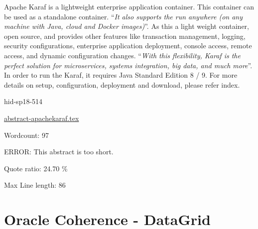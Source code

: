 Apache Karaf is a lightweight enterprise application container. This
container can be used as a standalone container.  \color{blue}``\emph{It also supports
the run anywhere (on any machine with Java, cloud and Docker
images)}''\color{black}\cite{hid-sp18-514-apachekaraf}.  As this a light weight
container, open source, and provides other features like transaction
management\cite{karaf_transaction}, logging, security configurations,
enterprise application deployment, console access, remote access, and
dynamic configuration changes. \color{blue}``\emph{With this flexibility, Karaf is the
perfect solution for microservices, systems integration, big data, and
much more}''\color{black}\cite{hid-sp18-514-apachekaraf}.  In order to run the Karaf,
it requires Java Standard Edition 8 / 9. For more details on setup,
configuration, deployment and download, please refer index.





\begin{IU}

hid-sp18-514

\href{https://github.com/cloudmesh-community/hid-sp18-514/blob/master//technology/abstract-apachekaraf.tex}{abstract-apachekaraf.tex}

 

Wordcount: 97

ERROR: This abstract is too short.


Quote ratio: 24.70 \%
 
Max Line length: 86
\end{IU}

\section{Oracle Coherence - DataGrid}

